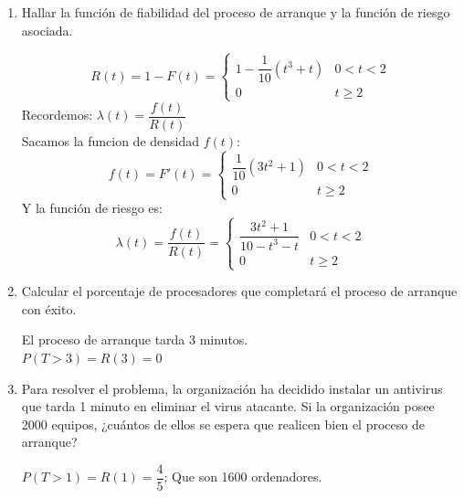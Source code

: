 \begin{enumerate}
    \item Hallar la función de fiabilidad del proceso de arranque y la función de riesgo asociada.
    \begin{tcolorbox}[colback=white,colframe=cyan!50!black,fonttitle=\bfseries]
    \[ R(t)=1-F(t)=\begin{cases} 
      1-\dfrac{1}{10}(t^3+t) & 0<t<2 \\
      0 & t\geq 2 
   \end{cases}
    \]
    Recordemos: $\lambda(t) = \dfrac{f(t)}{R(t)}$\\Sacamos la funcion de densidad $f(t)$:
    \[ f(t)=F'(t)=\begin{cases} 
      \dfrac{1}{10}(3t^2+1) & 0<t<2 \\
      0 & t\geq 2 
   \end{cases}
    \]
    Y la función de riesgo es:
    \[ \lambda(t) = \dfrac{f(t)}{R(t)}=\begin{cases} 
      \dfrac{3t^2+1}{10-t^3-t} & 0<t<2 \\
      0 & t\geq 2 
   \end{cases}
    \]
    \end{tcolorbox}
    \item Calcular el porcentaje de procesadores que completará el proceso de arranque con éxito.
    \begin{tcolorbox}[colback=white,colframe=cyan!50!black,fonttitle=\bfseries]
    El proceso de arranque tarda 3 minutos.\\
    $P(T>3)=R(3)=0$
    \end{tcolorbox}
    \item Para  resolver  el  problema,  la  organización  ha  decidido instalar  un  antivirus  que  tarda  1  minuto  en eliminar  el  virus atacante.  Si  la  organización  posee  2000  equipos,  ¿cuántos  de  ellos se  espera  que realicen bien el proceso de arranque?
    \begin{tcolorbox}[colback=white,colframe=cyan!50!black,fonttitle=\bfseries]
    $P(T>1)=R(1)=\dfrac{4}{5}$; Que son 1600 ordenadores.
    \end{tcolorbox}
\end{enumerate}